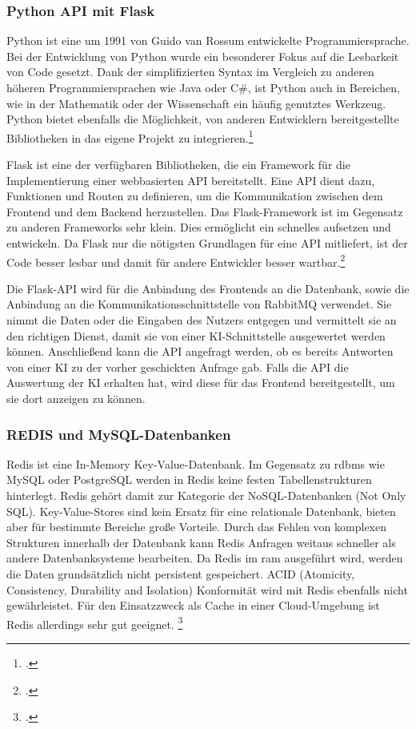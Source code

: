 \subsubsection{Python API mit Flask}
Python ist eine um 1991 von Guido van Rossum entwickelte Programmiersprache. Bei der Entwicklung von Python wurde ein besonderer Fokus auf die Lesbarkeit von Code gesetzt. Dank der simplifizierten Syntax im Vergleich zu anderen höheren Programmiersprachen wie Java oder C\#, ist Python auch in Bereichen, wie in der Mathematik oder der Wissenschaft ein häufig genutztes Werkzeug. Python bietet ebenfalls die Möglichkeit, von anderen Entwicklern bereitgestellte Bibliotheken in das eigene Projekt zu integrieren.\footcite{python2021python} 

Flask ist eine der verfügbaren Bibliotheken, die ein Framework für die Implementierung einer webbasierten API bereitstellt. Eine API dient dazu, Funktionen und Routen zu definieren, um die Kommunikation zwischen dem Frontend und dem Backend herzustellen. Das Flask-Framework ist im Gegensatz zu anderen Frameworks sehr klein. Dies ermöglicht ein schnelles aufsetzen und entwickeln. Da Flask nur die nötigsten Grundlagen für eine API mitliefert, ist der Code besser lesbar und damit für andere Entwickler besser wartbar.\footcite{grinberg2018flask} 

Die Flask-API wird für die Anbindung des Frontends an die Datenbank, sowie die Anbindung an die Kommunikationsschnittstelle von RabbitMQ verwendet. Sie nimmt die Daten oder die Eingaben des Nutzers entgegen und vermittelt sie an den richtigen Dienst, damit sie von einer KI-Schnittstelle ausgewertet werden können. Anschließend kann die API angefragt werden, ob es bereits Antworten von einer KI zu der vorher geschickten Anfrage gab. Falls die API die Auswertung der KI erhalten hat, wird diese für das Frontend bereitgestellt, um sie dort anzeigen zu können.  

\subsubsection{REDIS und MySQL-Datenbanken}
Redis ist eine In-Memory Key-Value-Datenbank. Im Gegensatz zu \ac{rdbms} wie MySQL oder PostgreSQL werden in Redis keine festen Tabellenstrukturen hinterlegt. Redis gehört damit zur Kategorie der NoSQL-Datenbanken (Not Only SQL). Key-Value-Stores sind kein Ersatz für eine relationale Datenbank, bieten aber für bestimmte Bereiche große Vorteile. Durch das Fehlen von komplexen Strukturen innerhalb der Datenbank kann Redis Anfragen weitaus schneller als andere Datenbanksysteme bearbeiten. Da Redis im \ac{ram} ausgeführt wird,  werden die Daten grundsätzlich nicht persistent gespeichert. ACID (Atomicity, Consistency, Durability and Isolation) Konformität wird mit Redis ebenfalls nicht gewährleistet. Für den Einsatzzweck als Cache in einer Cloud-Umgebung ist Redis allerdings sehr gut geeignet. \footcite{paksula2010persisting}

